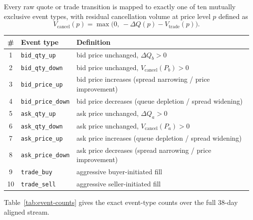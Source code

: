 Every raw quote or trade transition is mapped to exactly one of ten
mutually exclusive event types, with residual cancellation volume at
price level $p$ defined as
\[
  V_{\text{cancel}}(p) = \max\!\big(0,\ -\Delta Q(p) - V_{\text{trade}}(p)\big).
\]

\begin{center}
\begin{tabular}{@{}cll@{}}
\toprule
\# & Event type & Definition \\
\midrule
1 & \texttt{bid\_qty\_up}    & bid price unchanged, $\Delta Q_b > 0$ \\
2 & \texttt{bid\_qty\_down}  & bid price unchanged, $V_{\text{cancel}}(P_b) > 0$ \\
3 & \texttt{bid\_price\_up}   & bid price increases (spread narrowing / price improvement) \\
4 & \texttt{bid\_price\_down} & bid price decreases (queue depletion / spread widening) \\
5 & \texttt{ask\_qty\_up}    & ask price unchanged, $\Delta Q_a > 0$ \\
6 & \texttt{ask\_qty\_down}  & ask price unchanged, $V_{\text{cancel}}(P_a) > 0$ \\
7 & \texttt{ask\_price\_up}   & ask price increases (queue depletion / spread widening) \\
8 & \texttt{ask\_price\_down} & ask price decreases (spread narrowing / price improvement) \\
9 & \texttt{trade\_buy}      & aggressive buyer-initiated fill \\
10 & \texttt{trade\_sell}     & aggressive seller-initiated fill \\
\bottomrule
\end{tabular}
\end{center}

Table~\ref{tab:event-counts} gives the exact event-type counts over the
full 38-day aligned stream.


